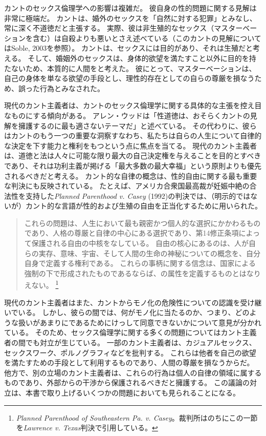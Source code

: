 \documentclass[paper=a4,book,openany]{jlreq} \usepackage{mystyle}
\begin{document}
カントのセックス倫理学への影響は複雑だ\citep[]{herman02:_could_it_be_worth_think}。
彼自身の性的問題に関する見解は非常に極端だ。
カントは、婚外のセックスを「自然に対する犯罪」とみなし、常に深く不道徳だと主張する。
実際、彼は非生殖的なセックス（マスターベーションを含む）は自殺よりも悪いとさえ述べている（このカントの見解についてはSoble, 2003\nocite{soble03:_kant_sexual_perver}を参照）。
カントは、セックスには目的があり、それは生殖だと考える。
そして、婚姻外のセックスは、身体的欲望を満たすこと以外に目的を持たないため、本質的に人間をと考えた。
彼にとって、マスターベーションは、自己の身体を単なる欲望の手段とし、理性的存在としての自らの尊厳を損なうため、誤った行為とみなされた。

現代のカント主義者は、カントのセックス倫理学に関する具体的な主張を控え目なものにする傾向がある。
アレン・ウッドは「性道徳は、おそらくカントの見解を擁護するのに最も適さないテーマだ」と述べている\citep[p.224]{wood08:_kantian_ethic}。
その代わりに、彼らはカントのもう一つの重要な洞察{\DDASH}すなわち、私たちは自らの人生について自律的な決定を下す能力と権利をもつ{\DDASH}という点に焦点を当てる。
現代のカント主義者は、道徳と法は人々に可能な限り最大の自己決定権を与えることを目的とすべきであり、それは功利主義が掲げる「最大多数の最大幸福」という原則よりも優先されるべきだと考える。
カント的な自律の概念は、性的自由に関する最も重要な判決にも反映されている。
たとえば、アメリカ合衆国最高裁が妊娠中絶の合法性を支持した\emph{Planned Parenthood v. Casey} (1992)の判決では、（明示的ではないが）カント的な言語が性的および生殖の自由を正当化するために用いられた。

\begin{quote}
これらの問題は、人生において最も親密かつ個人的な選択にかかわるものであり、人格の尊厳と自律の中心にある選択であり、第14修正条項によって保護される自由の中核をなしている。
自由の核心にあるのは、人が自らの実存、意味、宇宙、そして人間の生命の神秘についての概念を、自分自身で定義する権利である。
これらの事柄に関する信念は、国家による強制の下で形成されたものであるならば、の属性を定義するものとはなりえない。
\footnote{\emph{Planned Parenthood of Southeastern Pa. v. Casey}。裁判所はのちにこの一節を\emph{Lawrence v. Texas}判決で引用している。}
\end{quote}

現代のカント主義者はまた、カントからモノ化の危険性についての認識を受け継いでいる。
しかし、彼らの間では、何がモノ化に当たるのか、つまり、どのような扱いがあまりにであるためにけっして同意できないかについて意見が分かれている。
そのため、セックス倫理学に関する多くの問題についてはカント主義者の間でも対立が生じている。
一部のカント主義者は、カジュアルセックス、セックスワーク、ポルノグラフィなどを批判する。
これらは他者を自己の欲望を満たすための手段として利用するものであり、人間の尊厳を損なうからだ。
他方で、別の立場のカント主義者は、これらの行為は個人の自律の領域に属するものであり、外部からの干渉から保護されるべきだと擁護する。
この議論の対立は、本書で取り上げるいくつかの問題においても見られることになる。
\end{document}
